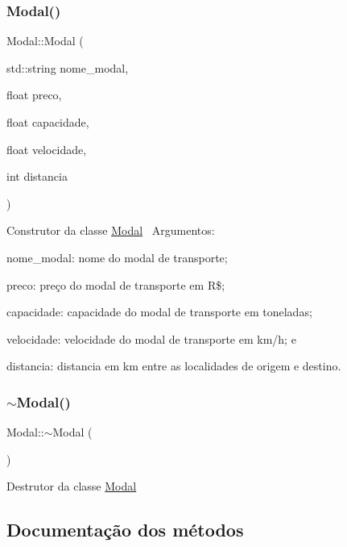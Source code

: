 \subsubsection{\texorpdfstring{Modal()}{Modal()}\hspace{0.1cm}{\footnotesize\ttfamily [2/2]}}
{\footnotesize\ttfamily Modal\+::\+Modal (\begin{DoxyParamCaption}\item[{std\+::string}]{nome\+\_\+modal,  }\item[{float}]{preco,  }\item[{float}]{capacidade,  }\item[{float}]{velocidade,  }\item[{int}]{distancia }\end{DoxyParamCaption})}

Construtor da classe \hyperlink{classModal}{Modal}~\newline
 Argumentos\+:
\begin{DoxyItemize}
\item nome\+\_\+modal\+: nome do modal de transporte;
\item preco\+: preço do modal de transporte em R\$;
\item capacidade\+: capacidade do modal de transporte em toneladas;
\item velocidade\+: velocidade do modal de transporte em km/h; e
\item distancia\+: distancia em km entre as localidades de origem e destino.~\newline

\end{DoxyItemize}\mbox{\label{classModal_a4a2e7830211c07075078b5d5186dab54}} 
\subsubsection{\texorpdfstring{$\sim$\+Modal()}{~Modal()}}
{\footnotesize\ttfamily Modal\+::$\sim$\+Modal (\begin{DoxyParamCaption}{ }\end{DoxyParamCaption})}

Destrutor da classe \hyperlink{classModal}{Modal}

\subsection{Documentação dos métodos}
\mbox{\label{classModal_ac9750361d92b6ad91674851852c7362f}} 
